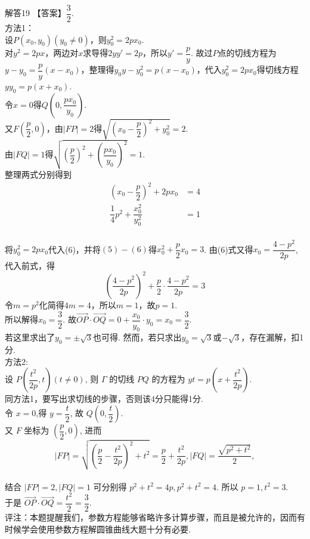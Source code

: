 \documentclass[11pt]{article}
\begin{document}
\heiti 解答19 \songti 【答案】$\dfrac{3}{2}$.
\\ \heiti 方法1： 
\\ \songti 设$ P(x_0,y_0)(y_0 \neq 0) $，则$ y_0^2=2px_0 $.
\\ 对$y^2=2px$，两边对$x$求导得$2yy'=2p$，所以$y'=\dfrac{p}{y}$.
故过$P$点的切线方程为$y-y_0=\dfrac{p}{y}(x-x_0)$，整理得$ y_0y-y_{0}^{2}=p(x-x_0) $，代入$ y_0^2=2px_0$得切线方程$yy_0=p(x+x_0)$.
\\ 令$x=0$得$Q\left ( 0,\dfrac{px_0}{y_0}  \right ) $.
\\又$ F\left ( \dfrac{p}{2},0  \right ) $，由$ \left | FP \right |=2  $得$ \sqrt{\left ( x_0-\dfrac{p}{2}  \right )^2+y_0^2 } =2 $.
\\由$ \left | FQ \right |=1  $得$ \sqrt{\left ( \dfrac{p}{2}  \right )^2 +\left ( \dfrac{px_0}{y_0}  \right ) ^2 } =1 $. 
\\整理两式分别得到
\begin{align}
	\left ( x_0-\dfrac{p}{2}  \right )^2+2px_0&=4  \\
	 \dfrac{1}{4}p^2+\dfrac{x_0^2}{y_0^2}&=1  
\end{align}
\\将$y_0^2=2px_0$代入(6)，并将$(5)-(6)$得$x_0^2+\dfrac{p}{2}x_0=3$.
由(6)式又得$x_0=\dfrac{4-p^2}{2p}$,代入前式，得
\begin{equation}
	\left ( \dfrac{4-p^2}{2p}  \right ) ^2+\dfrac{p}{2}\cdot \dfrac{4-p^2}{2p}=3  
\end{equation}
令$m=p^2 $化简得$4m=4$，所以$m=1$，故$p=1$.
\\ 所以解得$x_0=\dfrac{3}{2}$.
故$\overrightarrow{OP}\cdot \overrightarrow{OQ}=0+\dfrac{x_0}{y_0} \cdot y_0=x_0=\dfrac{3}{2} $. 
\\ \kaishu 若这里求出了$y_0=\pm \sqrt{3}$也可得. 然而，若只求出$ y_0=\sqrt{3} $或$-\sqrt{3}$，存在漏解，扣1分.
\\ \heiti 方法2:
\\ \songti 设 $P\left(\dfrac{t^{2}}{2 p}, t\right)(t \neq 0)$, 则 $\Gamma$ 的切线 $P Q$ 的方程为 $y t=p\left(x+\dfrac{t^{2}}{2 p}\right)$.  \\ \kaishu 同方法1，要写出求切线的步骤，否则该4分只能得1分.
\\ \songti 令 $x=0$,得 $y=\dfrac{t}{2}$, 故 $Q\left(0, \dfrac{t}{2}\right)$. 
\\又 $F$ 坐标为 $\left(\dfrac{p}{2}, 0\right)$, 进而
$$
|F P|=\sqrt{\left(\dfrac{p}{2}-\dfrac{t^{2}}{2 p}\right)^{2}+t^{2}}=\dfrac{p}{2}+\dfrac{t^{2}}{2 p},|F Q|=\dfrac{\sqrt{p^{2}+t^{2}}}{2},
$$
 \\
结合 $|F P|=2,|F Q|=1$ 可分别得 $p^{2}+t^{2}=4 p, p^{2}+t^{2}=4$. 所以 $p=1, t^{2}=3$. 
\\于是 $\overrightarrow{O P} \cdot \overrightarrow{O Q}=\dfrac{t^{2}}{2}=\dfrac{3}{2}$.
\\ \heiti 评注：\songti 本题提醒我们，参数方程能够省略许多计算步骤，而且是被允许的，因而有时候学会使用参数方程解圆锥曲线大题十分有必要.
\end{document}

